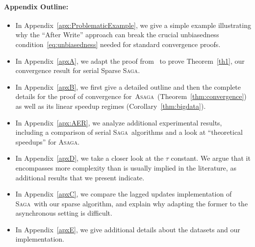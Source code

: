 \documentclass[twoside]{article}
\newcommand{\overlap}{\tau}
\newcommand{\ASAGA}{\textsc{Asaga}}
\newcommand{\SAGA}{\textsc{Saga}}
\begin{document}



\clearpage
\appendix
\onecolumn
\fontsize{11}{13}
\selectfont

\paragraph{Appendix Outline:}
\begin{itemize}
\item In Appendix~\ref{apx:ProblematicExample}, we give a simple example illustrating why the ``After Write'' approach can break the crucial unbiasedness condition~\eqref{eq:unbiasedness} needed for standard convergence proofs.
\item In Appendix~\ref{apxA}, we adapt the proof from~\citet{qsaga} to prove Theorem~\ref{th1}, our convergence result for serial Sparse \SAGA.
\item In Appendix~\ref{apxB}, we first give a detailed outline and then the complete details for the proof of convergence for~\ASAGA\ (Theorem~\ref{thm:convergence}) as well as its linear speedup regimes  (Corollary~\ref{thm:bigdata}).
\item In Appendix~\ref{apx:AER}, we analyze additional experimental results, including a comparison of serial \SAGA\ algorithms and a look at ``theoretical speedups'' for \ASAGA.
\item In Appendix~\ref{apxD}, we take a closer look at the $\overlap$ constant. We argue that it encompasses more complexity than is usually implied in the literature, as additional results that we present indicate.
\item In Appendix~\ref{apxC}, we compare the lagged updates implementation of \SAGA\ with our sparse algorithm, and explain why adapting the former to the asynchronous setting is difficult.
\item In Appendix~\ref{apxE}, we give additional details about the datasets and our implementation.
\end{itemize}
\end{document}
